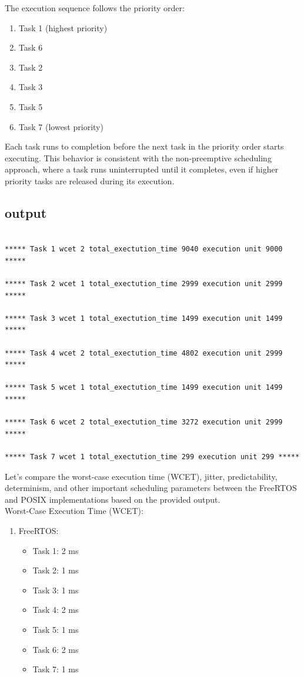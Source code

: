 \documentclass[a4paper,11pt]{article}%
\newenvironment{qanda}{\setlength{\parindent}{0pt}}{\bigskip}
\begin{document}
\begin{qanda}
	The execution sequence follows the priority order:
	\begin{enumerate}
		\item Task 1 (highest priority)
		\item Task 6
		\item Task 2
		\item Task 3
		\item Task 5
		\item Task 7 (lowest priority)
	\end{enumerate}


	Each task runs to completion before the next task in the priority order starts executing. This behavior is consistent with the non-preemptive scheduling approach, where a task runs uninterrupted until it completes, even if higher priority tasks are released during its execution.\\
	\subsection{output}
	\begin{lstlisting}
				
***** Task 1 wcet 2 total_exectution_time 9040 execution unit 9000 *****

***** Task 2 wcet 1 total_exectution_time 2999 execution unit 2999 *****

***** Task 3 wcet 1 total_exectution_time 1499 execution unit 1499 *****

***** Task 4 wcet 2 total_exectution_time 4802 execution unit 2999 *****

***** Task 5 wcet 1 total_exectution_time 1499 execution unit 1499 *****

***** Task 6 wcet 2 total_exectution_time 3272 execution unit 2999 *****

***** Task 7 wcet 1 total_exectution_time 299 execution unit 299 *****

			\end{lstlisting}
	Let's compare the worst-case execution time (WCET), jitter, predictability, determinism, and other important scheduling parameters between the FreeRTOS and POSIX implementations based on the provided output.\\

	Worst-Case Execution Time (WCET):\\
	\begin{enumerate}
		\item FreeRTOS:
		      \begin{itemize}
			      \item Task 1: 2 ms
			      \item Task 2: 1 ms
			      \item Task 3: 1 ms
			      \item Task 4: 2 ms
			      \item Task 5: 1 ms
			      \item Task 6: 2 ms
			      \item Task 7: 1 ms
		      \end{itemize}
	\end{enumerate}


\end{qanda}
\end{document}
